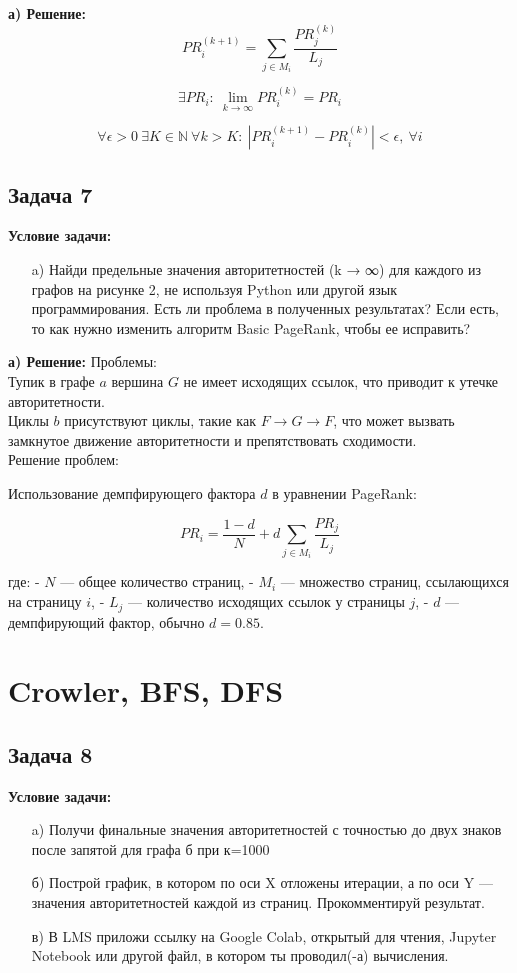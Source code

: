 \documentclass[a4paper,12pt]{article}
\begin{document}
\textbf{а) Решение:}
\[
PR_i^{(k+1)} = \sum_{j \in M_i} \frac{PR_j^{(k)}}{L_j}
\]

\[
\exists PR_i: \ \lim_{k \to \infty} PR_i^{(k)} = PR_i
\]

\[
\forall \epsilon > 0 \ \exists K \in \mathbb{N} \ \forall k > K: \ |PR_i^{(k+1)} - PR_i^{(k)}| < \epsilon, \ \forall i
\]
\vspace{1cm}

\subsection{Задача 7}
\textbf{Условие задачи:}
\begin{itemize}
    \item[a)] Найди предельные значения авторитетностей (k → ∞) для каждого из графов на рисунке 2, не
используя Python или другой язык программирования. Есть ли проблема в полученных результатах?
Если есть, то как нужно изменить алгоритм Basic PageRank, чтобы ее исправить?
\end{itemize}
\textbf{а) Решение:}
Проблемы:\\

Тупик в графе \( a \) вершина \( G \) не имеет исходящих ссылок, что приводит к утечке авторитетности.\\
  
Циклы \( b \) присутствуют циклы, такие как \( F \to G \to F \), что может вызвать замкнутое движение авторитетности и препятствовать сходимости.\\

Решение проблем:

Использование демпфирующего фактора \( d \) в уравнении PageRank:

\[
PR_i = \frac{1 - d}{N} + d \sum_{j \in M_i} \frac{PR_j}{L_j}
\]

где:
- \( N \) — общее количество страниц,
- \( M_i \) — множество страниц, ссылающихся на страницу \( i \),
- \( L_j \) — количество исходящих ссылок у страницы \( j \),
- \( d \) — демпфирующий фактор, обычно \( d = 0.85 \).
\vspace{1cm}
\section{Crowler, BFS, DFS}

\subsection{Задача 8}
\textbf{Условие задачи:}
\begin{itemize}
    \item[a)]  Получи финальные значения авторитетностей с точностью до двух знаков после запятой для графа б при к=1000
    \item[б)] Построй график, в котором по оси X отложены итерации, а по оси Y — значения авторитетностей
каждой из страниц. Прокомментируй результат.
    \item[в)] В LMS приложи ссылку на Google Colab, открытый для чтения, Jupyter Notebook или другой
файл, в котором ты проводил(-а) вычисления.
\end{itemize}
\end{document}
